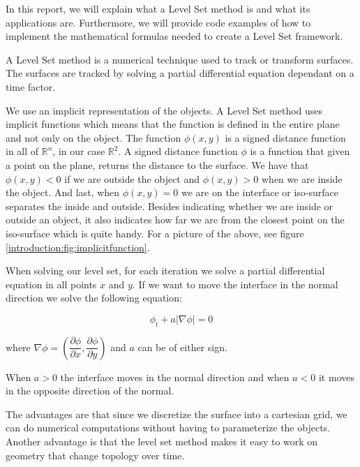 In this report, we will explain what a Level Set method is and what its applications are. Furthermore, we will provide code examples of how to implement the mathematical formulas needed to create a Level Set framework. 

A Level Set method is a numerical technique used to track or transform surfaces. The surfaces are tracked by solving a partial differential equation dependant on a time factor. 

We use an implicit representation of the objects. A Level Set method uses implicit functions which means that the function is defined in the entire plane and not only on the object. The function $\phi(x,y)$ is a signed distance function in all of $\mathbb{R}^{n}$, in our case $\mathbb{R}^{2}$. A signed distance function $\phi$ is a function that given a point on the plane, returns the distance to the surface. We have that $\phi(x,y) < 0$ if we are outside the object and $\phi(x,y) > 0$ when we are inside the object. And last, when $\phi(x,y) = 0$ we are on the interface or iso-surface separates the inside and outside. Besides indicating whether we are inside or outside an object, it also indicates how far we are from the closest point on the iso-surface which is quite handy. For a picture of the above, see figure \ref{introduction:fig:implicitfunction}.



When solving our level set, for each iteration we solve a partial differential equation in all points $x$ and $y$. If we want to move the interface in the normal direction we solve the following equation:

\begin{equation}
\label{introduction:eq:levelsetndirection}
  \phi_{t} + a|\nabla \phi| = 0
\end{equation}

where $\nabla \phi = (\dfrac{\partial \phi}{\partial x}, \dfrac{\partial \phi}{\partial y})$  and $a$ can be of either sign. 

When $a > 0$ the interface moves in the normal direction and when $a < 0$ it moves in the opposite direction of the normal.

The advantages are that since we discretize the surface into a cartesian grid, we can do numerical computations without having to parameterize the objects. Another advantage is that the level set method makes it easy to work on geometry that change topology over time.



